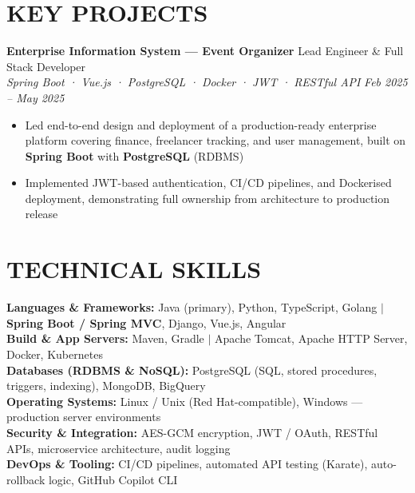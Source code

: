 \documentclass[10pt,a4paper]{article}
\newcommand{\experienceheader}[4]{
    \textbf{#1} \hfill #2 \\
    \textit{#3} \hfill \textit{#4}
}
\begin{document}
\section*{KEY PROJECTS}

\experienceheader{Enterprise Information System --- Event Organizer}{Lead Engineer \& Full Stack Developer}{Spring Boot · Vue.js · PostgreSQL · Docker · JWT · RESTful API}{Feb 2025 -- May 2025}
\begin{itemize}[leftmargin=*, itemsep=0.5pt, topsep=1pt]
    \item Led end-to-end design and deployment of a production-ready enterprise platform covering finance, freelancer tracking, and user management, built on \textbf{Spring Boot} with \textbf{PostgreSQL} (RDBMS)
    \item Implemented JWT-based authentication, CI/CD pipelines, and Dockerised deployment, demonstrating full ownership from architecture to production release
\end{itemize}


\vspace{-4pt}

\section*{TECHNICAL SKILLS}

\textbf{Languages \& Frameworks:} Java (primary), Python, TypeScript, Golang $|$ \textbf{Spring Boot / Spring MVC}, Django, Vue.js, Angular \\
\textbf{Build \& App Servers:} Maven, Gradle $|$ Apache Tomcat, Apache HTTP Server, Docker, Kubernetes \\
\textbf{Databases (RDBMS \& NoSQL):} PostgreSQL (SQL, stored procedures, triggers, indexing), MongoDB, BigQuery \\
\textbf{Operating Systems:} Linux / Unix (Red Hat-compatible), Windows --- production server environments \\
\textbf{Security \& Integration:} AES-GCM encryption, JWT / OAuth, RESTful APIs, microservice architecture, audit logging \\
\textbf{DevOps \& Tooling:} CI/CD pipelines, automated API testing (Karate), auto-rollback logic, GitHub Copilot CLI

\vspace{-4pt}
\end{document}
